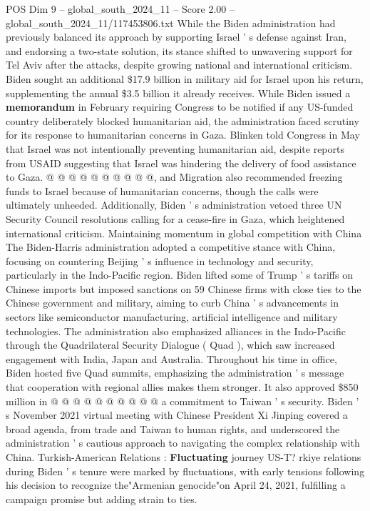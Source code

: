 \begin{textsample}{POS Dim 9 – global\_south\_2024\_11 – Score 2.00 – global\_south\_2024\_11/117453806.txt}
While the Biden administration had previously balanced its approach by supporting Israel ' s defense against Iran, and endorsing a two-state solution, its stance shifted to unwavering support for Tel Aviv after the attacks, despite growing national and international criticism.
Biden sought an additional \$17.9 billion in military aid for Israel upon his return, supplementing the annual \$3.5 billion it already receives.
While Biden issued a \textbf{memorandum} in February requiring Congress to be notified if any US-funded country deliberately blocked humanitarian aid, the administration faced scrutiny for its response to humanitarian concerns in Gaza.
Blinken told Congress in May that Israel was not intentionally preventing humanitarian aid, despite reports from USAID suggesting that Israel was hindering the delivery of food assistance to Gaza. @ @ @ @ @ @ @ @ @ @, and Migration also recommended freezing funds to Israel because of humanitarian concerns, though the calls were ultimately unheeded.
Additionally, Biden ' s administration vetoed three UN Security Council resolutions calling for a cease-fire in Gaza, which heightened international criticism.
Maintaining momentum in global competition with China The Biden-Harris administration adopted a competitive stance with China, focusing on countering Beijing ' s influence in technology and security, particularly in the Indo-Pacific region.
Biden lifted some of Trump ' s tariffs on Chinese imports but imposed sanctions on 59 Chinese firms with close ties to the Chinese government and military, aiming to curb China ' s advancements in sectors like semiconductor manufacturing, artificial intelligence and military technologies.
The administration also emphasized alliances in the Indo-Pacific through the Quadrilateral Security Dialogue ( Quad ), which saw increased engagement with India, Japan and Australia.
Throughout his time in office, Biden hosted five Quad summits, emphasizing the administration ' s message that cooperation with regional allies makes them stronger.
It also approved \$850 million in @ @ @ @ @ @ @ @ @ @ a commitment to Taiwan ' s security.
Biden ' s November 2021 virtual meeting with Chinese President Xi Jinping covered a broad agenda, from trade and Taiwan to human rights, and underscored the administration ' s cautious approach to navigating the complex relationship with China.
Turkish-American Relations : \textbf{Fluctuating} journey US-T? rkiye relations during Biden ' s tenure were marked by fluctuations, with early tensions following his decision to recognize the"Armenian genocide"on April 24, 2021, fulfilling a campaign promise but adding strain to ties.

\end{textsample}
